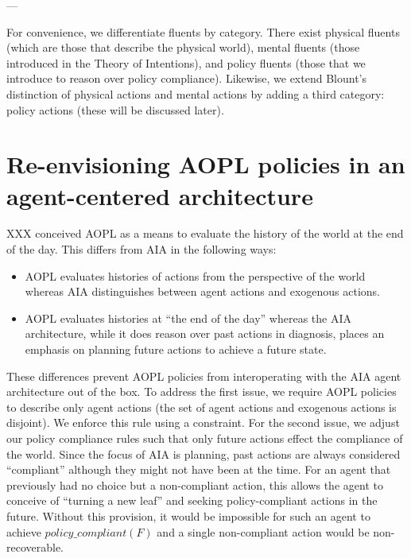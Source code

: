 ---

For convenience, we differentiate fluents by category.
There exist physical fluents (which are those that describe the physical world), mental fluents (those introduced in the Theory of Intentions), and policy fluents (those that we introduce to reason over policy compliance).
Likewise, we extend Blount's distinction of physical actions and mental actions by adding a third category: policy actions (these will be discussed later).

\section{Re-envisioning AOPL policies in an agent-centered architecture}

XXX conceived AOPL as a means to evaluate the history of the world at the end of the day.
This differs from AIA in the following ways:

\begin{itemize}
    \item AOPL evaluates histories of actions from the perspective of the world whereas AIA distinguishes between agent actions and exogenous actions.
    \item AOPL evaluates histories at ``the end of the day'' whereas the AIA architecture, while it does reason over past actions in diagnosis, places an emphasis on planning future actions to achieve a future state.
\end{itemize}

These differences prevent AOPL policies from interoperating with the AIA agent architecture out of the box.
To address the first issue, we require AOPL policies to describe only agent actions (the set of agent actions and exogenous actions is disjoint).
We enforce this rule using a constraint.
For the second issue, we adjust our policy compliance rules such that only future actions effect the compliance of the world.
Since the focus of AIA is planning, past actions are always considered ``compliant'' although they might not have been at the time.
For an agent that previously had no choice but a non-compliant action, this allows the agent to conceive of ``turning a new leaf'' and seeking policy-compliant actions in the future.
Without this provision, it would be impossible for such an agent to achieve $policy\_compliant(F)$ and a single non-compliant action would be non-recoverable.

